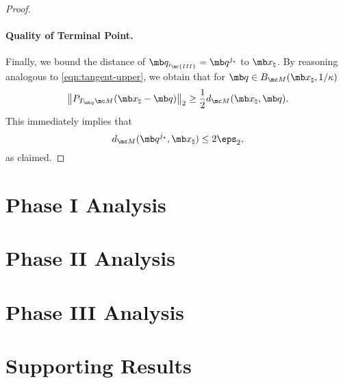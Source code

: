 \begin{proof}
\paragraph{Quality of Terminal Point.} Finally, we bound the distance of $\mb q_{i_{\mr{III}}} = \mb q^{j_\star}$ to $\mb x_\natural$. By reasoning analogous to \eqref{eqn:tangent-upper}, we obtain that for $\mb q \in B_{\mc M}(\mb x_\natural, 1/\kappa)$
\begin{equation}
        \left\| P_{T_{\mb q} \mc M}(\mb x_\natural - \mb q) \right\|_2 \ge \frac{1}{2} d_{\mc M}(\mb x_\natural, \mb q ). 
\end{equation}
This immediately implies that 
\begin{equation}
    d_{\mc M}(\mb q^{j_\star}, \mb x_\natural ) \le 2 \eps_2, 
\end{equation}
as claimed. 
\end{proof}



\section{Phase I Analysis}



\section{Phase II Analysis} 



\section{Phase III Analysis} 


\appendix 


\section{Supporting Results} 





